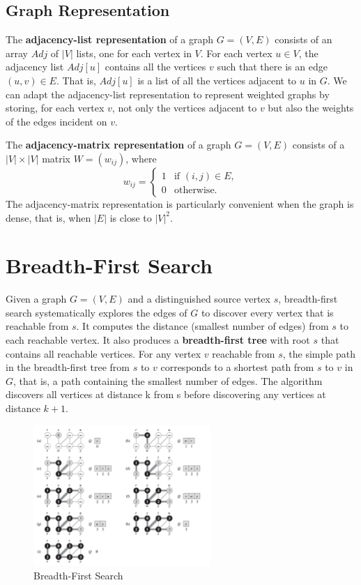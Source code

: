 \subsection*{Graph Representation}

The \textbf{adjacency-list representation} of a graph $G = (V, E)$ consists of an array $Adj$ of $|V|$ lists, one for each vertex in $V$. For each vertex $u \in V$, the adjacency list $Adj[u]$ contains all the vertices $v$ such that there is an edge $(u, v) \in E$. That is, $Adj[u]$ is a list of all the vertices adjacent to $u$ in $G$.
We can adapt the adjacency-list representation to represent weighted graphs by storing, for each vertex $v$, not only the vertices adjacent to $v$ but also the weights of the edges incident on $v$.

The \textbf{adjacency-matrix representation} of a graph $G = (V, E)$ consists of a $|V| \times |V|$ matrix $W = (w_{ij})$, where
\[
    w_{ij} = 
    \begin{cases}
        1 & \text{if } (i, j) \in E, \\
        0 & \text{otherwise}.
    \end{cases}
\]
The adjacency-matrix representation is particularly convenient when the graph is dense, that is, when $|E|$ is close to $|V|^2$.

\section{Breadth-First Search}

Given a graph $G = (V, E)$ and a distinguished source vertex $s$, breadth-first search systematically explores the edges of $G$ to discover every vertex that is reachable from $s$. It computes the distance (smallest number of edges) from $s$ to each reachable vertex.
It also produces a \textbf{breadth-first tree} with root $s$ that contains all reachable vertices. For any vertex $v$ reachable from $s$, the simple path in the breadth-first tree from $s$ to $v$ corresponds to a shortest path from $s$ to $v$ in $G$, that is, a path containing the smallest number of edges.
The algorithm discovers all vertices at distance k from s before discovering any
vertices at distance $k+1$.


\begin{figure}[H]
    \centering
    \includegraphics[width=0.6\textwidth]{assets/bfs.png}
    \caption{Breadth-First Search}
    \label{fig:bfs}
\end{figure}

